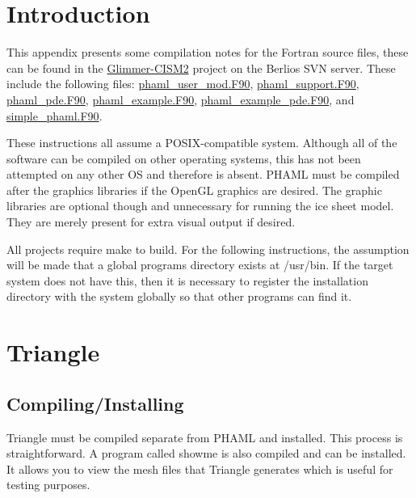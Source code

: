 \section{Introduction}
This appendix presents some compilation notes for the Fortran source files, these can be found in the \href{http://developer.berlios.de/projects/glimmer-cism/}{Glimmer-CISM2} project on the Berlios SVN server.  These include the following files:
\href{http://svn.berlios.de/svnroot/repos/glimmer-cism/glimmer-cism2/libphaml/phaml\_user\_mod.F90}{phaml\_user\_mod.F90},
\href{http://svn.berlios.de/svnroot/repos/glimmer-cism/glimmer-cism2/libphaml/phaml\_support.F90}{phaml\_support.F90},
\href{http://svn.berlios.de/svnroot/repos/glimmer-cism/glimmer-cism2/libphaml/phaml\_pde.F90}{phaml\_pde.F90},
\href{http://svn.berlios.de/svnroot/repos/glimmer-cism/glimmer-cism2/libphaml/phaml\_example.F90}{phaml\_example.F90},
\href{http://svn.berlios.de/svnroot/repos/glimmer-cism/glimmer-cism2/libphaml/phaml\_example\_pde.F90}{phaml\_example\_pde.F90}, and 
\href{http://svn.berlios.de/svnroot/repos/glimmer-cism/glimmer-cism2/libphaml/simple\_phaml.F90}{simple\_phaml.F90}.

These instructions all assume a POSIX-compatible system.  Although all of the software can be compiled on other operating systems, this has not been attempted on any other OS and therefore is absent.  PHAML must be compiled after the graphics libraries if the OpenGL graphics are desired.  The graphic libraries are optional though and unnecessary for running the ice sheet model.  They are merely present for extra visual output if desired.


All projects require make to build.  For the following instructions, the assumption will be made that a global programs directory exists at /usr/bin.  If the target system does not have this, then it is necessary to register the installation directory with the system globally so that other programs can find it.
\section{Triangle}
\subsection{Compiling/Installing}
Triangle must be compiled separate from PHAML and installed.  This process is straightforward.  A program called showme is also compiled and can be installed.  It allows you to view the mesh files that Triangle generates which is useful for testing purposes.

